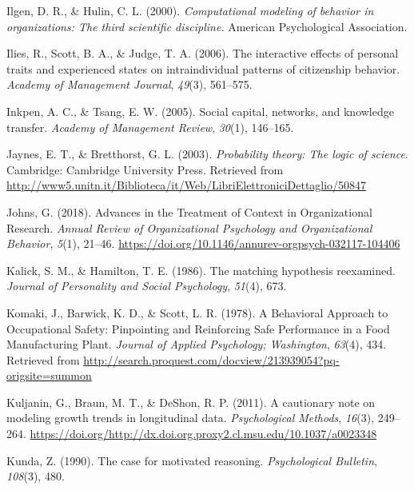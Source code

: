 \documentclass[english,,man]{apa6}
\begin{document}
\leavevmode\hypertarget{ref-ilgen_computational_2000}{}%
Ilgen, D. R., \& Hulin, C. L. (2000). \emph{Computational modeling of behavior in organizations: The third scientific discipline.} American Psychological Association.

\leavevmode\hypertarget{ref-ilies_interactive_2006}{}%
Ilies, R., Scott, B. A., \& Judge, T. A. (2006). The interactive effects of personal traits and experienced states on intraindividual patterns of citizenship behavior. \emph{Academy of Management Journal}, \emph{49}(3), 561--575.

\leavevmode\hypertarget{ref-inkpen_social_2005}{}%
Inkpen, A. C., \& Tsang, E. W. (2005). Social capital, networks, and knowledge transfer. \emph{Academy of Management Review}, \emph{30}(1), 146--165.

\leavevmode\hypertarget{ref-jaynes_probability_2003}{}%
Jaynes, E. T., \& Bretthorst, G. L. (2003). \emph{Probability theory: The logic of science}. Cambridge: Cambridge University Press. Retrieved from \url{http://www5.unitn.it/Biblioteca/it/Web/LibriElettroniciDettaglio/50847}

\leavevmode\hypertarget{ref-johns_advances_2018}{}%
Johns, G. (2018). Advances in the Treatment of Context in Organizational Research. \emph{Annual Review of Organizational Psychology and Organizational Behavior}, \emph{5}(1), 21--46. \url{https://doi.org/10.1146/annurev-orgpsych-032117-104406}

\leavevmode\hypertarget{ref-kalick_matching_1986}{}%
Kalick, S. M., \& Hamilton, T. E. (1986). The matching hypothesis reexamined. \emph{Journal of Personality and Social Psychology}, \emph{51}(4), 673.

\leavevmode\hypertarget{ref-komaki_behavioral_1978}{}%
Komaki, J., Barwick, K. D., \& Scott, L. R. (1978). A Behavioral Approach to Occupational Safety: Pinpointing and Reinforcing Safe Performance in a Food Manufacturing Plant. \emph{Journal of Applied Psychology; Washington}, \emph{63}(4), 434. Retrieved from \url{http://search.proquest.com/docview/213939054?pq-origsite=summon}

\leavevmode\hypertarget{ref-kuljanin_cautionary_2011}{}%
Kuljanin, G., Braun, M. T., \& DeShon, R. P. (2011). A cautionary note on modeling growth trends in longitudinal data. \emph{Psychological Methods}, \emph{16}(3), 249--264. \url{https://doi.org/http://dx.doi.org.proxy2.cl.msu.edu/10.1037/a0023348}

\leavevmode\hypertarget{ref-kunda_case_1990}{}%
Kunda, Z. (1990). The case for motivated reasoning. \emph{Psychological Bulletin}, \emph{108}(3), 480.
\end{document}
